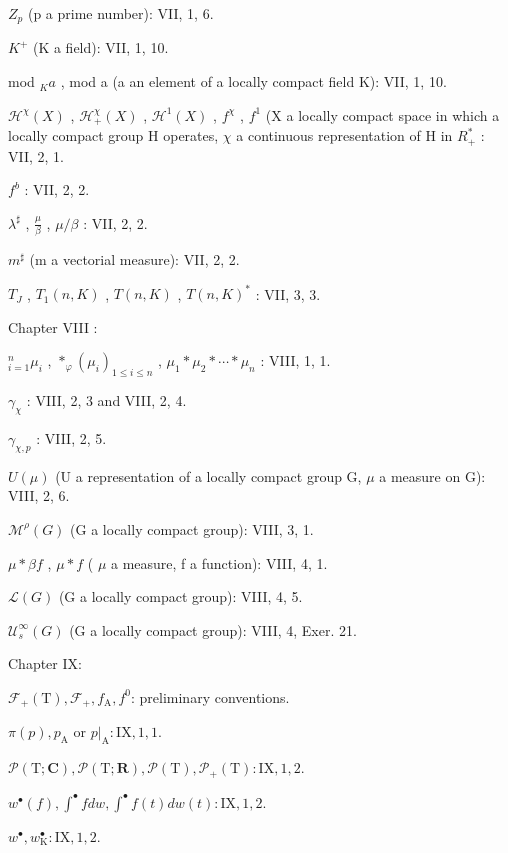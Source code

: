 \(Z_{p}\) (p a prime number): VII, 1, 6.

\(K^{+}\) (K a field): VII, 1, 10.

mod \(_{K}a\) , mod a (a an element of a locally compact field K): VII, 1, 10.

\(\mathcal{H}^{\chi}(X)\) , \(\mathcal{H}_{+}^{\chi}(X)\) , \(\mathcal{H}^{1}(X)\) , \(f^{\chi}\) , \(f^{1}\) (X a locally compact space in which a locally compact group H operates, \(\chi\) a continuous representation of H in \(R_{+}^{*}\) : VII, 2, 1.

\(f^{b}\) : VII, 2, 2.

\(\lambda^{\sharp}\) , \(\frac{\mu}{\beta}\) , \(\mu/\beta\) : VII, 2, 2.

\(m^{\sharp}\) (m a vectorial measure): VII, 2, 2.

\(T_{J}\) , \(T_{1}(n,K)\) , \(T(n,K)\) , \(T(n,K)^{*}\) : VII, 3, 3.

Chapter VIII :

\(^{n}_{i=1}\mu_{i}\) , \(*_{\varphi}(\mu_{i})_{1\leqslant i\leqslant n}\) , \(\mu_{1}*\mu_{2}*\cdots*\mu_{n}\) : VIII, 1, 1.

\(\gamma_{\chi}\) : VIII, 2, 3 and VIII, 2, 4.

\(\gamma_{\chi,p}\) : VIII, 2, 5.

\(U(\mu)\) (U a representation of a locally compact group G, \(\mu\) a measure on G): VIII, 2, 6.

\(\mathcal{M}^{\rho}(G)\) (G a locally compact group): VIII, 3, 1.

\(\mu*\beta f\) , \(\mu*f\) ( \(\mu\) a measure, f a function): VIII, 4, 1.

\(\mathcal{L}(G)\) (G a locally compact group): VIII, 4, 5.

\(\mathcal{U}_{s}^{\infty}(G)\) (G a locally compact group): VIII, 4, Exer. 21.

Chapter IX:

\(\mathcal{F}_{+}(\mathrm{T}), \mathcal{F}_{+}, f_{\mathrm{A}}, f^{0}\): preliminary conventions.

\(\pi(p), p_{\mathrm{A}}\) or \(p|_{\mathrm{A}}: \mathrm{IX}, 1, 1\).

\(\mathcal{P}(\mathrm{T}; \mathbf{C}), \mathcal{P}(\mathrm{T}; \mathbf{R}), \mathcal{P}(\mathrm{T}), \mathcal{P}_{+}(\mathrm{T}): \mathrm{IX}, 1, 2\).

\(w^{\bullet}(f), \int^{\bullet} f dw, \int^{\bullet} f(t) dw(t): \mathrm{IX}, 1, 2\).

\(w^{\bullet}, w_{\mathrm{K}}^{\bullet}: \mathrm{IX}, 1, 2\).

